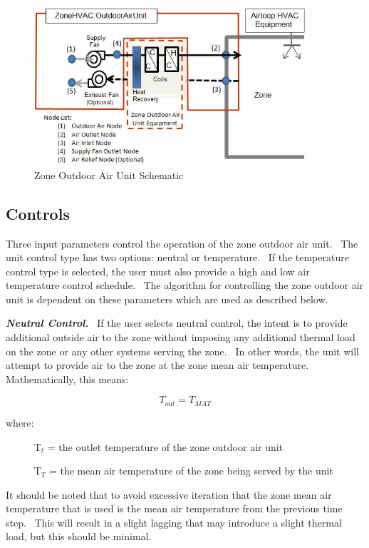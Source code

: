 \begin{figure}[hbtp] %
\centering
\includegraphics[width=0.9\textwidth, height=0.9\textheight, keepaspectratio=true]{media/image7466.png}
\caption{Zone Outdoor Air Unit Schematic \protect \label{fig:zone-outdoor-air-unit-schematic}}
\end{figure}

\subsection{Controls}\label{controls-2-000}

Three input parameters control the operation of the zone outdoor air unit.~ The unit control type has two options: neutral or temperature.~ If the temperature control type is selected, the user must also provide a high and low air temperature control schedule.~ The algorithm for controlling the zone outdoor air unit is dependent on these parameters which are used as described below.

\textbf{\emph{Neutral Control.}}~ If the user selects neutral control, the intent is to provide additional outside air to the zone without imposing any additional thermal load on the zone or any other systems serving the zone.~ In other words, the unit will attempt to provide air to the zone at the zone mean air temperature.~ Mathematically, this means:

\begin{equation}
{T_{out}} = {T_{MAT}}
\end{equation}

where:

~~~~~ T\(_{t}\) = the outlet temperature of the zone outdoor air unit

~~~~~ T\(_{T}\) = the mean air temperature of the zone being served by the unit

It should be noted that to avoid excessive iteration that the zone mean air temperature that is used is the mean air temperature from the previous time step.~ This will result in a slight lagging that may introduce a slight thermal load, but this should be minimal.

